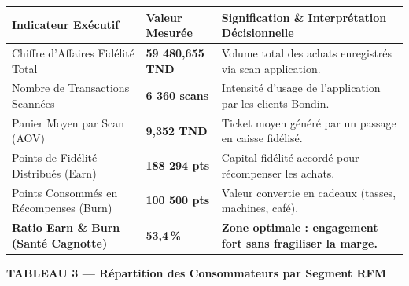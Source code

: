 \documentclass[11pt,a4paper]{article}
\begin{document}
\noindent
\renewcommand{\arraystretch}{0.98}
\begin{tabularx}{\textwidth}{>{\scriptsize}p{5.5cm} >{\scriptsize\centering\bfseries}p{3.2cm} >{\scriptsize}X}
\toprule
\rowcolor{c4border}\color{white}\textbf{Indicateur Exécutif} & \color{white}\textbf{Valeur Mesurée} & \color{white}\textbf{Signification \& Interprétation Décisionnelle} \\
\midrule
\rowcolor{c4bg!60} Chiffre d'Affaires Fidélité Total & 59 480,655 TND & Volume total des achats enregistrés via scan application. \\
\rowcolor{white} Nombre de Transactions Scannées & 6 360 scans & Intensité d'usage de l'application par les clients Bondin. \\
\rowcolor{c4bg!60} Panier Moyen par Scan (AOV) & 9,352 TND & Ticket moyen généré par un passage en caisse fidélisé. \\
\rowcolor{white} Points de Fidélité Distribués (Earn) & 188 294 pts & Capital fidélité accordé pour récompenser les achats. \\
\rowcolor{c4bg!60} Points Consommés en Récompenses (Burn) & 100 500 pts & Valeur convertie en cadeaux (tasses, machines, café). \\
\rowcolor{white} \textbf{Ratio Earn \& Burn (Santé Cagnotte)} & \textcolor{c3border!80!black}{\textbf{53,4\,\%}} & \textcolor{c3border!80!black}{\textbf{Zone optimale : engagement fort sans fragiliser la marge.}} \\
\bottomrule
\end{tabularx}

\vspace{0.2cm}

\noindent
{\small\bfseries\color{c5border} TABLEAU 3 --- Répartition des Consommateurs par Segment RFM}
\vspace{0.08cm}
\end{document}
